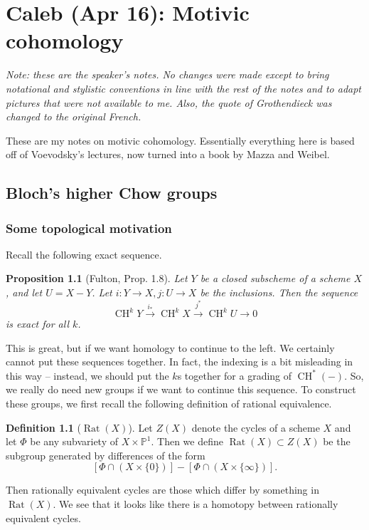 \documentclass[leqno, openany]{memoir}
\newtheorem{prop}[thm]{Proposition}
\theoremstyle{definition}
\newtheorem{defn}[thm]{Definition}
\theoremstyle{remark}
\theoremstyle{plain}
\theoremstyle{definition}
\theoremstyle{remark}
\renewcommand{\P}{\mathbb{P}}
\DeclareMathOperator{\CH}{CH}
\DeclareMathOperator{\Rat}{Rat}
\begin{document}
\chapter{Caleb (Apr 16): Motivic cohomology}%
\label{cha:caleb_apr_16_motivic_cohomology}

\textit{Note: these are the speaker's notes. No changes were made except to
bring notational and stylistic conventions in line with the rest of the notes
and to adapt pictures that were not available to me. Also, the quote of
Grothendieck was changed to the original French.} 

These are my notes on motivic cohomology.  Essentially everything here is based
off of Voevodsky's lectures, now turned into a book by Mazza and Weibel. 

\section{Bloch's higher Chow groups}

\subsection{Some topological motivation} Recall the following exact sequence. 

\begin{prop} [Fulton, Prop. 1.8] Let $Y$ be a closed subscheme of a scheme $X$,
    and let $U=X-Y$.  Let $i:Y\rightarrow X, j:U\rightarrow X$ be the
    inclusions.  Then the sequence \[
        \CH^kY\xrightarrow{i_*}\CH^kX\xrightarrow{j^*}\CH^kU\rightarrow 0 \] is
    exact for all $k$.  \end{prop} 

This is great, but if we want homology to continue to the left.  We certainly
cannot put these sequences together.  In fact, the indexing is a bit misleading
in this way -- instead, we should put the $k$s together for a grading of
$\CH^*(-)$.  So, we really do need new groups if we want to continue this
sequence.  To construct these groups, we first recall the following definition
of rational equivalence. 

\begin{defn} [$\Rat(X)$] Let $Z(X)$ denote the cycles of a scheme $X$ and let
    $\Phi$ be any subvariety of $X\times \P^1$.  Then we define $\Rat(X)\subset
    Z(X)$ be the subgroup generated by differences of the form \[ [\Phi\cap
        (X\times \{0\})] - [\Phi\cap (X\times \{\infty\})].  \] \end{defn} Then
        rationally equivalent cycles are those which differ by something in
        $\Rat(X)$.  We see that it looks like there is a homotopy between
        rationally equivalent cycles. \\  
\end{document}
